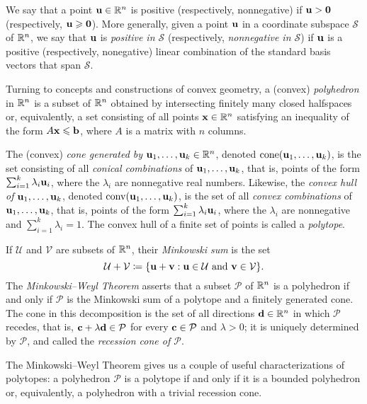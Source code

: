 \documentclass[11pt]{amsart}
\begin{document}
We say that a point $\mathbf{u}\in \mathbb{R}^n$ is positive (respectively, nonnegative) if $\mathbf{u} > \mathbf{0}$ (respectively, $\mathbf{u}\geqslant \mathbf{0}$).
More generally, given a point $\mathbf{u}$ in a coordinate subspace $\mathcal{S}$ of $\mathbb{R}^n$, we say that $\mathbf{u}$ is \emph{positive in $\mathcal{S}$} (respectively, \emph{nonnegative in $\mathcal{S}$}) if $\mathbf{u}$ is a positive (respectively, nonegative) linear combination of the standard basis vectors that span $\mathcal{S}$.

Turning to concepts and constructions of convex geometry, a (convex) \emph{polyhedron} in $\mathbb{R}^n$ is a subset of $\mathbb{R}^n$ obtained by intersecting finitely many closed halfspaces or, equivalently, a set consisting of all points $\mathbf{x}\in \mathbb{R}^n$ satisfying an inequality of the form $A\mathbf{x}\leqslant \mathbf{b}$, where $A$ is a matrix with $n$ columns.

The (convex) \emph{cone generated by $\mathbf{u}_1,\ldots,\mathbf{u}_k \in \mathbb{R}^n$}, denoted $\operatorname{cone}(\mathbf{u}_1,\ldots,\mathbf{u}_k)$, is the set consisting of all \emph{conical combinations} of $\mathbf{u}_1, \ldots, \mathbf{u}_k$, that is, points of the form $\sum_{i=1}^k \lambda_i \mathbf{u}_i$, where the $\lambda_i$ are nonnegative real numbers.
Likewise, the \emph{convex hull of $\mathbf{u}_1,\ldots,\mathbf{u}_k$}, denoted $\operatorname{conv}(\mathbf{u}_1,\ldots,\mathbf{u}_k)$, is the set of all \emph{convex combinations} of $\mathbf{u}_1, \ldots, \mathbf{u}_k$, that is, points of the form $\sum_{i=1}^k \lambda_i \mathbf{u}_i$, where the $\lambda_i$ are nonnegative and $\sum_{i=1}^k \lambda_i = 1$.
The convex hull of a finite set of points is called a \emph{polytope}.

If $\mathcal{U}$ and $\mathcal{V}$ are subsets of $\mathbb{R}^n$, their \emph{Minkowski sum} is the set
\[\mathcal{U}+\mathcal{V} \coloneqq \{\mathbf{u}+\mathbf{v}: \mathbf{u}\in \mathcal{U}\text{ and }\mathbf{v}\in \mathcal{V}\}.\]
The \emph{Minkowski--Weyl Theorem} asserts that a subset $\mathcal{P}$ of $\mathbb{R}^n$ is a polyhedron if and only if $\mathcal{P}$ is the Minkowski sum of a polytope and a finitely generated cone.
The cone in this decomposition is the set of all directions $\mathbf{d} \in \mathbb{R}^n$ in which $\mathcal{P}$ recedes, that is, $\mathbf{c} + \lambda \mathbf{d} \in \mathcal{P}$ for every $\mathbf{c} \in \mathcal{P}$ and $\lambda > 0$; it is uniquely determined by $\mathcal{P}$, and called the \emph{recession cone of $\mathcal{P}$}.

The Minkowski--Weyl Theorem gives us a couple of useful characterizations of polytopes: a polyhedron $\mathcal{P}$ is a polytope if and only if it is a bounded polyhedron or, equivalently, a polyhedron with a trivial recession cone. 
\end{document}
